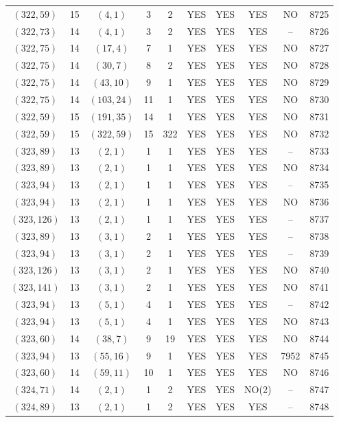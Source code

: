\begin{longtable}{|c|c|c|c|c|c|c|c|c|c|}
$(322, 59)$ & 15 & $(4, 1)$ & 3 & 2 & YES & YES & YES & NO & 8725\\
$(322, 73)$ & 14 & $(4, 1)$ & 3 & 2 & YES & YES & YES & -- & 8726\\
$(322, 75)$ & 14 & $(17, 4)$ & 7 & 1 & YES & YES & YES & NO & 8727\\
$(322, 75)$ & 14 & $(30, 7)$ & 8 & 2 & YES & YES & YES & NO & 8728\\
$(322, 75)$ & 14 & $(43, 10)$ & 9 & 1 & YES & YES & YES & NO & 8729\\
$(322, 75)$ & 14 & $(103, 24)$ & 11 & 1 & YES & YES & YES & NO & 8730\\
$(322, 59)$ & 15 & $(191, 35)$ & 14 & 1 & YES & YES & YES & NO & 8731\\
$(322, 59)$ & 15 & $(322, 59)$ & 15 & 322 & YES & YES & YES & NO & 8732\\
$(323, 89)$ & 13 & $(2, 1)$ & 1 & 1 & YES & YES & YES & -- & 8733\\
$(323, 89)$ & 13 & $(2, 1)$ & 1 & 1 & YES & YES & YES & NO & 8734\\
$(323, 94)$ & 13 & $(2, 1)$ & 1 & 1 & YES & YES & YES & -- & 8735\\
$(323, 94)$ & 13 & $(2, 1)$ & 1 & 1 & YES & YES & YES & NO & 8736\\
$(323, 126)$ & 13 & $(2, 1)$ & 1 & 1 & YES & YES & YES & -- & 8737\\
$(323, 89)$ & 13 & $(3, 1)$ & 2 & 1 & YES & YES & YES & -- & 8738\\
$(323, 94)$ & 13 & $(3, 1)$ & 2 & 1 & YES & YES & YES & -- & 8739\\
$(323, 126)$ & 13 & $(3, 1)$ & 2 & 1 & YES & YES & YES & NO & 8740\\
$(323, 141)$ & 13 & $(3, 1)$ & 2 & 1 & YES & YES & YES & NO & 8741\\
$(323, 94)$ & 13 & $(5, 1)$ & 4 & 1 & YES & YES & YES & -- & 8742\\
$(323, 94)$ & 13 & $(5, 1)$ & 4 & 1 & YES & YES & YES & NO & 8743\\
$(323, 60)$ & 14 & $(38, 7)$ & 9 & 19 & YES & YES & YES & NO & 8744\\
$(323, 94)$ & 13 & $(55, 16)$ & 9 & 1 & YES & YES & YES & 7952 & 8745\\
$(323, 60)$ & 14 & $(59, 11)$ & 10 & 1 & YES & YES & YES & NO & 8746\\
$(324, 71)$ & 14 & $(2, 1)$ & 1 & 2 & YES & YES & NO(2) & -- & 8747\\
$(324, 89)$ & 13 & $(2, 1)$ & 1 & 2 & YES & YES & YES & -- & 8748\\

\end{longtable}
